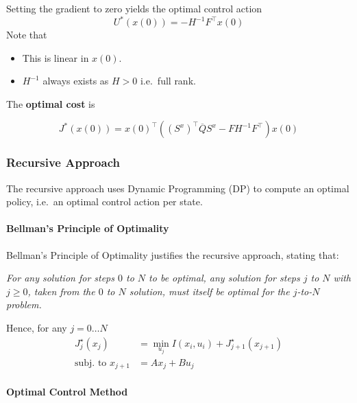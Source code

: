 \newpar{}

Setting the gradient to zero yields the optimal control action
\noindent\begin{equation*}
    U^*(x(0)) = -H^{-1}F^\top x(0)
\end{equation*}
Note that
\begin{itemize}
    \item This is linear in $x(0)$.
    \item $H^{-1}$ always exists as $H>0$ i.e.\ full rank.
\end{itemize}

\newpar{}
The \textbf{optimal cost} is

\noindent\begin{equation*}
    J^*(x(0)) = {x(0)}^{\top}\left({(S^{x})}^{\top}\overline{Q}S^{x}- F H^{-1} F^\top\right)x(0)
\end{equation*}

\subsubsection{Recursive Approach}
The recursive approach uses Dynamic Programming (DP) to compute an optimal policy, i.e.\ an optimal control action per state.

\paragraph{Bellman's Principle of Optimality}

Bellman's Principle of Optimality justifies the recursive approach, stating that:

\textit{For any solution for steps $0$ to $N$ to be optimal, any solution for steps $j$ to $N$ with $j \geq 0$, taken from the $0$ to $N$ solution, must itself be optimal for the $j$-to-$N$ problem.}

Hence, for any $j=0\dots N$
\begin{align*}
    J_{j}^{\star}(x_{j})     & =\min_{u_{j}}I(x_{i},u_{i})+J_{j+1}^{\star}(x_{j+1}) \\
    \text{subj.\ to }x_{j+1} & =Ax_{j}+Bu_{j}
\end{align*}

\paragraph{Optimal Control Method}


